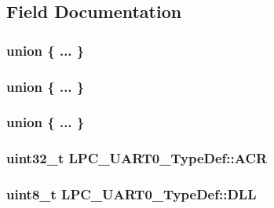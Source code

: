 \subsection{Field Documentation}
\subsubsection[{\texorpdfstring{"@40}{@40}}]{\setlength{\rightskip}{0pt plus 5cm}union \{ ... \} }\hypertarget{structLPC__UART0__TypeDef_ace7c056b2d4c658ee71b6315e70d0116}{}\label{structLPC__UART0__TypeDef_ace7c056b2d4c658ee71b6315e70d0116}
\subsubsection[{\texorpdfstring{"@42}{@42}}]{\setlength{\rightskip}{0pt plus 5cm}union \{ ... \} }\hypertarget{structLPC__UART0__TypeDef_aaea0b493879af21f36a29a2ddaee3b71}{}\label{structLPC__UART0__TypeDef_aaea0b493879af21f36a29a2ddaee3b71}
\subsubsection[{\texorpdfstring{"@44}{@44}}]{\setlength{\rightskip}{0pt plus 5cm}union \{ ... \} }\hypertarget{structLPC__UART0__TypeDef_a96c88f58afca1bf278b1a416db02ad1a}{}\label{structLPC__UART0__TypeDef_a96c88f58afca1bf278b1a416db02ad1a}
\subsubsection[{\texorpdfstring{A\+CR}{ACR}}]{ uint32\+\_\+t L\+P\+C\+\_\+\+U\+A\+R\+T0\+\_\+\+Type\+Def\+::\+A\+CR}\hypertarget{structLPC__UART0__TypeDef_a0518203067bd82ba86f61964fa5d27ba}{}\label{structLPC__UART0__TypeDef_a0518203067bd82ba86f61964fa5d27ba}
\subsubsection[{\texorpdfstring{D\+LL}{DLL}}]{ uint8\+\_\+t L\+P\+C\+\_\+\+U\+A\+R\+T0\+\_\+\+Type\+Def\+::\+D\+LL}\hypertarget{structLPC__UART0__TypeDef_ab2ca502f17a630b5a86338ad625d0533}{}\label{structLPC__UART0__TypeDef_ab2ca502f17a630b5a86338ad625d0533}
